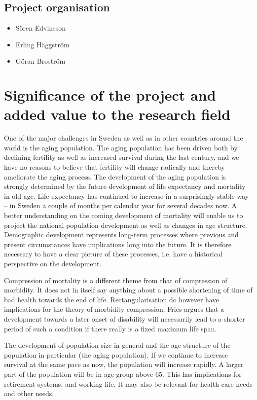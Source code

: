 \documentclass[a4paper,12pt]{article}
\begin{document}
\subsection{Project organisation}
		
\begin{itemize}

\item[] Sören Edvinsson 	
\item[]Erling Häggström
\item[]Göran Broström	
\end{itemize}

\section{Significance of the project and added value to the research field}

One of the major challenges in Sweden as well as in other countries around
the world is the aging population. The aging population has been driven
both by declining fertility as well as increased survival during the last
century, and we have no reasons to believe that fertility will change
radically and thereby ameliorate the aging process. The development of the
aging population is strongly determined by the future development of life
expectancy and mortality in old age. Life expectancy has continued to
increase in a surprisingly stable way – in Sweden a couple of months per
calendar year for several decades now. A better understanding on the coming
development of mortality will enable us to project the national population
development as well as changes in age structure. Demographic development
represents long-term processes where previous and present circumstances
have implications long into the future. It is therefore necessary to have a
clear picture of these processes, i.e. have a historical perspective on the
development.
 
Compression of mortality is a different theme from that of compression of
morbidity. It does not in itself say anything about a possible shortening
of time of bad health towards the end of life. Rectangularisation do
however have implications for the theory of morbidity compression. Fries
argues that a development towards a later onset of disability will
necessarily lead to a shorter period of such a condition if there really is
a fixed maximum life span.
  
The development of population size in general and the age structure of the
population in particular (the aging population). If we continue to increase
survival at the same pace as now, the population will increase rapidly. A
larger part of the population will be in age group above 65. This has
implications for retirement systems, and working life. It may also be
relevant for health care needs and other needs.
\end{document}

